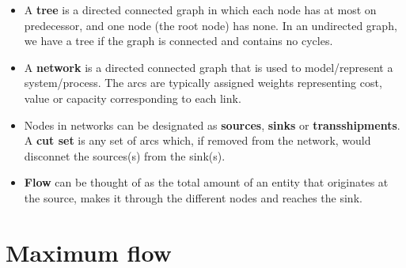 \documentclass{beamer}
\begin{document}
\begin{frame}[allowframebreaks]
  \begin{itemize}
    \item A {\bf tree} is a directed connected graph in which each node has at most on predecessor, and one node (the root node) has none. In an undirected graph, we have a tree if the graph is connected and contains no cycles.
    \begin{center}
\end{center}

    \item A {\bf network} is a directed connected graph that is used to model/represent a system/process. The arcs are typically assigned weights representing cost, value or capacity corresponding to each link.
    \item Nodes in networks can be designated as {\bf sources}, {\bf sinks} or {\bf transshipments}. A {\bf cut set} is any set of arcs which, if removed from the network, would disconnet the sources(s) from the sink(s).
    \item {\bf Flow} can be thought of as the total amount of an entity that originates at the source, makes it through the different nodes and reaches the sink.
  \end{itemize}
\end{frame}

\section{Maximum flow}
\end{document}
